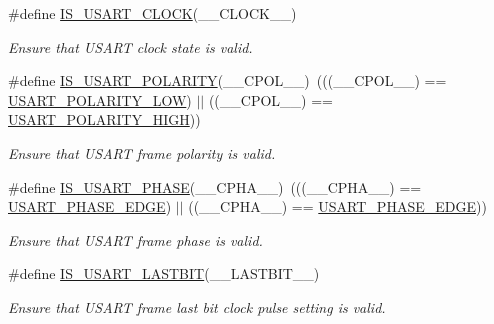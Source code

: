\begin{DoxyCompactItemize}
\#define \hyperlink{group___u_s_a_r_t___private___macros_gacbbea45fe9da2990a6da839373b4efaa}{I\+S\+\_\+\+U\+S\+A\+R\+T\+\_\+\+C\+L\+O\+CK}(\+\_\+\+\_\+\+C\+L\+O\+C\+K\+\_\+\+\_\+)
\begin{DoxyCompactList}\small\item\em Ensure that U\+S\+A\+RT clock state is valid. \end{DoxyCompactList}\item 
\#define \hyperlink{group___u_s_a_r_t___private___macros_gadf1beba58ae096520a8b3807cfa660b1}{I\+S\+\_\+\+U\+S\+A\+R\+T\+\_\+\+P\+O\+L\+A\+R\+I\+TY}(\+\_\+\+\_\+\+C\+P\+O\+L\+\_\+\+\_\+)~(((\+\_\+\+\_\+\+C\+P\+O\+L\+\_\+\+\_\+) == \hyperlink{group___u_s_a_r_t___clock___polarity_ga5afb62c05704ca0e750ca8f4bb5ccc7d}{U\+S\+A\+R\+T\+\_\+\+P\+O\+L\+A\+R\+I\+T\+Y\+\_\+\+L\+OW}) $\vert$$\vert$ ((\+\_\+\+\_\+\+C\+P\+O\+L\+\_\+\+\_\+) == \hyperlink{group___u_s_a_r_t___clock___polarity_ga3b3e3d798d4797a220346f6b14d257ee}{U\+S\+A\+R\+T\+\_\+\+P\+O\+L\+A\+R\+I\+T\+Y\+\_\+\+H\+I\+GH}))
\begin{DoxyCompactList}\small\item\em Ensure that U\+S\+A\+RT frame polarity is valid. \end{DoxyCompactList}\item 
\#define \hyperlink{group___u_s_a_r_t___private___macros_ga6cd720e6cc78786d5117b6f01691685a}{I\+S\+\_\+\+U\+S\+A\+R\+T\+\_\+\+P\+H\+A\+SE}(\+\_\+\+\_\+\+C\+P\+H\+A\+\_\+\+\_\+)~(((\+\_\+\+\_\+\+C\+P\+H\+A\+\_\+\+\_\+) == \hyperlink{group___u_s_a_r_t___clock___phase_gab050873df3eb3844f973e61681e02e6a}{U\+S\+A\+R\+T\+\_\+\+P\+H\+A\+S\+E\+\_\+E\+D\+GE}) $\vert$$\vert$ ((\+\_\+\+\_\+\+C\+P\+H\+A\+\_\+\+\_\+) == \hyperlink{group___u_s_a_r_t___clock___phase_ga080cff411c6cefbb511162fcc91c43ec}{U\+S\+A\+R\+T\+\_\+\+P\+H\+A\+S\+E\+\_\+E\+D\+GE}))
\begin{DoxyCompactList}\small\item\em Ensure that U\+S\+A\+RT frame phase is valid. \end{DoxyCompactList}\item 
\#define \hyperlink{group___u_s_a_r_t___private___macros_ga56c70252e8ad4e58e739fe14c9f7f807}{I\+S\+\_\+\+U\+S\+A\+R\+T\+\_\+\+L\+A\+S\+T\+B\+IT}(\+\_\+\+\_\+\+L\+A\+S\+T\+B\+I\+T\+\_\+\+\_\+)
\begin{DoxyCompactList}\small\item\em Ensure that U\+S\+A\+RT frame last bit clock pulse setting is valid. \end{DoxyCompactList}\end{DoxyCompactItemize}


